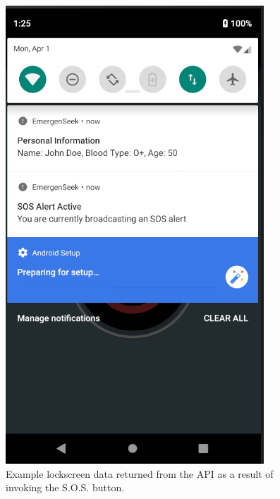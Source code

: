 \documentclass[10pt, a4paper]{article}
\begin{document}
\begin{figure}[H]
  \includegraphics[width=\linewidth]{img/notification.png}
  \caption{Example lockscreen data returned from the API as a result of invoking the S.O.S. button.}
\endminipage\hfill
{}%

\end{figure}
\end{document}
